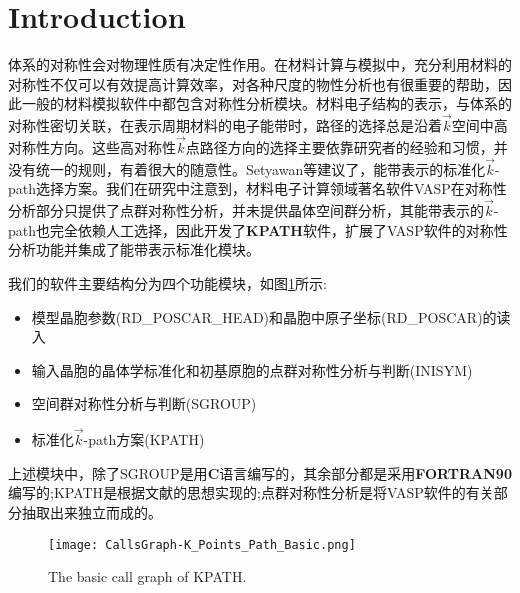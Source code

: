 \documentclass{article}      %
\newcommand{\upcite}[1]{\hspace{0ex}\textsuperscript{\cite{#1}}} %
\begin{document}


\section{Introduction}
体系的对称性会对物理性质有决定性作用。在材料计算与模拟中，充分利用材料的对称性不仅可以有效提高计算效率，对各种尺度的物性分析也有很重要的帮助，因此一般的材料模拟软件中都包含对称性分析模块。材料电子结构的表示，与体系的对称性密切关联，在表示周期材料的电子能带时，路径的选择总是沿着$\vec k$空间中高对称性方向。这些高对称性$\vec k$点路径方向的选择主要依靠研究者的经验和习惯，并没有统一的规则，有着很大的随意性。\textrm{Setyawan}等\upcite{CMS49-299_2010}建议了，能带表示的标准化$\vec k$-\textrm{path}选择方案。我们在研究中注意到，材料电子计算领域著名软件\textrm{VASP}在对称性分析部分只提供了点群对称性分析，并未提供晶体空间群分析，其能带表示的$\vec k$-\textrm{path}也完全依赖人工选择，因此开发了\textbf{KPATH}软件，扩展了\textrm{VASP}软件的对称性分析功能并集成了能带表示标准化模块。

我们的软件主要结构分为四个功能模块，如图\ref{Call_graph:basic}所示:
\begin{itemize}
	\item 模型晶胞参数(\textrm{RD\_POSCAR\_HEAD})和晶胞中原子坐标(\textrm{RD\_POSCAR})的读入
	\item 输入晶胞的晶体学标准化和初基原胞的点群对称性分析与判断(\textrm{INISYM})
	\item 空间群对称性分析与判断(SGROUP)
	\item 标准化$\vec k$-\textrm{path}方案(\textrm{KPATH})
\end{itemize}
上述模块中，除了\textrm{SGROUP}是用\textbf{C}语言编写的，其余部分都是采用\textbf{FORTRAN90}编写的;\textrm{KPATH}是根据文献\cite{CMS49-299_2010}的思想实现的;点群对称性分析是将\textrm{VASP}软件的有关部分抽取出来独立而成的。
\begin{figure}[h!]
\centering
\texttt{[image: CallsGraph-K\_Points\_Path\_Basic.png]}
\caption{\small The basic call graph of KPATH.}%
\label{Call_graph:basic}
\end{figure}
\end{document}
